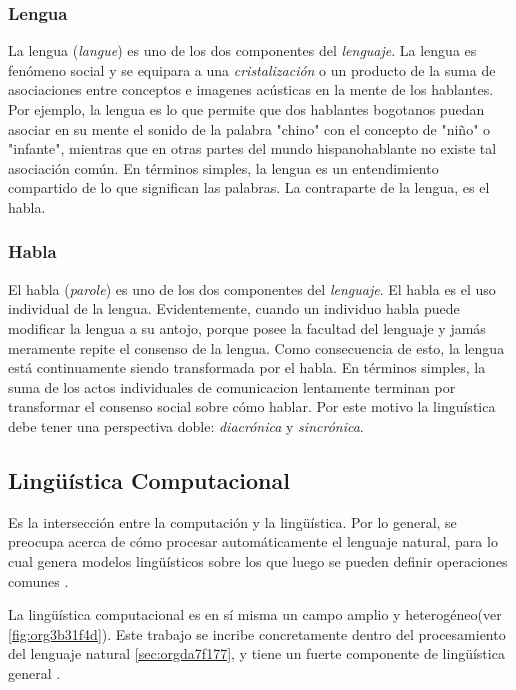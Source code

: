 \documentclass[12pt,letterpaper,twoside]{article}
\begin{document}
\subsubsection{Lengua}
\label{sec:org671ecb2}

La lengua (\emph{langue}) es uno de los dos componentes del
\emph{lenguaje}.  La lengua es fenómeno social y se equipara a una
\emph{cristalización} o un producto de la suma de asociaciones entre
conceptos e imagenes acústicas en la mente de los hablantes. Por
ejemplo, la lengua es lo que permite que dos hablantes bogotanos
puedan asociar en su mente el sonido de la palabra "chino" con el
concepto de "niño" o "infante", mientras que en otras partes del
mundo hispanohablante no existe tal asociación común.
En términos simples, la lengua es un entendimiento compartido de
lo que significan las palabras. La contraparte de la lengua,
es el habla. 

\subsubsection{Habla}
\label{sec:orgefa5962}
El habla (\emph{parole}) es uno de los dos componentes del
\emph{lenguaje}. El habla es el uso individual de la lengua.
Evidentemente, cuando un individuo habla puede modificar
la lengua a su antojo, porque posee la facultad del
lenguaje y jamás meramente repite el consenso de la lengua.
Como consecuencia de esto, la lengua está continuamente
siendo transformada por el habla. En términos simples,
la suma de los actos individuales de comunicacion lentamente
terminan por transformar el consenso social sobre cómo
hablar.  Por este motivo la linguística debe tener una
perspectiva doble: \emph{diacrónica} y \emph{sincrónica}.


\subsection{Lingüística Computacional}
\label{sec:org4140995}

Es la intersección entre la computación y la lingüística. Por lo
general, se preocupa acerca de cómo procesar automáticamente el
lenguaje natural, para lo cual genera modelos lingüísticos sobre los
que luego se pueden definir operaciones comunes \cite{gelbukh2004}.


La lingüística computacional es en sí misma un campo amplio y
heterogéneo(ver \ref{fig:org3b31f4d}).
Este trabajo se incribe concretamente dentro del procesamiento
del lenguaje natural \ref{sec:orgda7f177}, y tiene un fuerte componente de
lingüística general .
\end{document}
